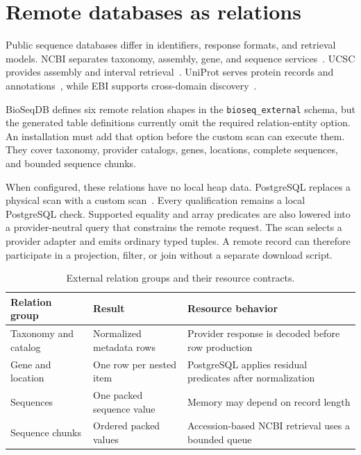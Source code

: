 \section{Remote databases as relations}
\label{sec:external-relations}

\begingroup
\setlength{\emergencystretch}{3em}
Public sequence databases differ in identifiers, response formats, and
retrieval models. NCBI separates taxonomy, assembly, gene, and sequence
services~\cite{ncbi_datasets_v2_api}. UCSC provides assembly and interval
retrieval~\cite{ucsc_rest_api}. UniProt serves protein records and
annotations~\cite{uniprot_programmatic_access}, while EBI supports cross-domain
discovery~\cite{ebi_search_rest_api}.
\par
\endgroup

BioSeqDB defines six remote relation shapes in the \texttt{bioseq\_external}
schema, but the generated table definitions currently omit the required
relation-entity option. An installation must add that option before the custom
scan can execute them. They cover taxonomy, provider catalogs, genes,
locations, complete sequences, and bounded sequence chunks.

When configured, these relations have no local heap data. PostgreSQL replaces
a physical scan with a custom scan~\cite{postgresql17_custom_scan}. Every
qualification remains a local PostgreSQL check. Supported equality and array
predicates are also lowered into a provider-neutral query that constrains the
remote request. The scan selects a provider adapter and emits ordinary typed tuples. A
remote record can therefore participate in a projection, filter, or join
without a separate download script.

\begin{table}[htbp]
  \centering
  \small
  \caption{External relation groups and their resource contracts.}
  \label{tab:external-relations}
  \begin{tabularx}{\linewidth}{p{.25\linewidth}p{.31\linewidth}X}
    \toprule
    Relation group & Result & Resource behavior \\
    \midrule
    Taxonomy and catalog & Normalized metadata rows & Provider response is
    decoded before row production \\
    Gene and location & One row per nested item & PostgreSQL applies residual
    predicates after normalization \\
    Sequences & One packed sequence value & Memory may depend on record length \\
    Sequence chunks & Ordered packed values & Accession-based NCBI retrieval
    uses a bounded queue \\
    \bottomrule
  \end{tabularx}
\end{table}


